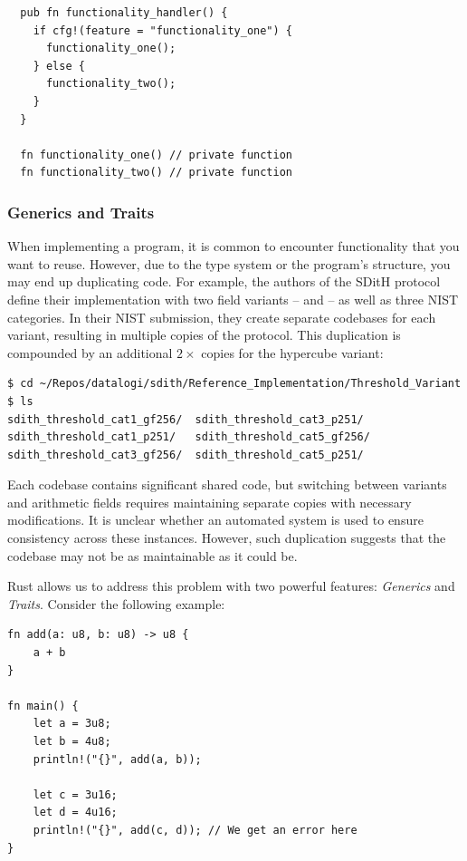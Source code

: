 \documentclass[11pt]{report}
\theoremstyle{definition}
\theoremstyle{plain}
\begin{document}
\begin{verbatim}
  pub fn functionality_handler() {
    if cfg!(feature = "functionality_one") {
      functionality_one();
    } else {
      functionality_two();
    }
  }

  fn functionality_one() // private function
  fn functionality_two() // private function
\end{verbatim}

\subsubsection{Generics and Traits}

When implementing a program, it is common to encounter functionality that you want to reuse. However, due to the type system or the program's structure, you may end up duplicating code. For example, the authors of the SDitH protocol define their implementation with two field variants --  and  -- as well as three NIST categories. In their NIST submission, they create separate codebases for each variant, resulting in multiple copies of the protocol. This duplication is compounded by an additional $2\times$ copies for the hypercube variant:

\begin{verbatim}
$ cd ~/Repos/datalogi/sdith/Reference_Implementation/Threshold_Variant 
$ ls
sdith_threshold_cat1_gf256/  sdith_threshold_cat3_p251/
sdith_threshold_cat1_p251/   sdith_threshold_cat5_gf256/
sdith_threshold_cat3_gf256/  sdith_threshold_cat5_p251/
\end{verbatim}

Each codebase contains significant shared code, but switching between variants and arithmetic fields requires maintaining separate copies with necessary modifications. It is unclear whether an automated system is used to ensure consistency across these instances. However, such duplication suggests that the codebase may not be as maintainable as it could be.

Rust allows us to address this problem with two powerful features: \textit{Generics} and \textit{Traits}. Consider the following example:

\begin{verbatim}
fn add(a: u8, b: u8) -> u8 {
    a + b
}

fn main() {
    let a = 3u8;
    let b = 4u8;
    println!("{}", add(a, b));

    let c = 3u16;
    let d = 4u16;
    println!("{}", add(c, d)); // We get an error here
}
\end{verbatim}
\end{document}
